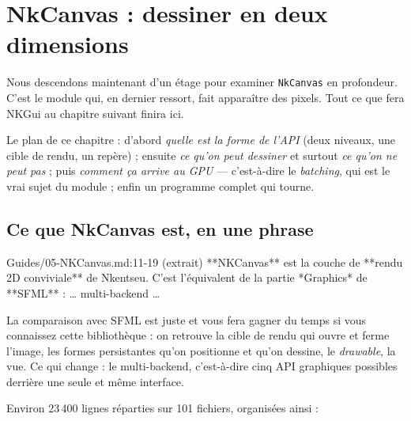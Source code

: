 \chapter{NkCanvas : dessiner en deux dimensions}

Nous descendons maintenant d'un étage pour examiner \texttt{NkCanvas} en
profondeur. C'est le module qui, en dernier ressort, fait apparaître des pixels.
Tout ce que fera NKGui au chapitre suivant finira ici.

Le plan de ce chapitre : d'abord \emph{quelle est la forme de l'API} (deux
niveaux, une cible de rendu, un repère) ; ensuite \emph{ce qu'on peut dessiner}
et surtout \emph{ce qu'on ne peut pas} ; puis \emph{comment ça arrive au GPU} —
c'est-à-dire le \emph{batching}, qui est le vrai sujet du module ; enfin un
programme complet qui tourne.

\section{Ce que NkCanvas est, en une phrase}

\begin{nkcode}{Guides/05-NKCanvas.md:11-19 (extrait)}
**NKCanvas** est la couche de **rendu 2D conviviale** de Nkentseu. C'est
l'équivalent de la partie *Graphics* de **SFML** : … multi-backend …
\end{nkcode}

La comparaison avec SFML est juste et vous fera gagner du temps si vous
connaissez cette bibliothèque : on retrouve la cible de rendu qui ouvre et ferme
l'image, les formes persistantes qu'on positionne et qu'on dessine, le
\emph{drawable}, la vue. Ce qui change : le multi-backend, c'est-à-dire cinq API
graphiques possibles derrière une seule et même interface.

Environ 23\,400 lignes réparties sur 101 fichiers, organisées ainsi :

